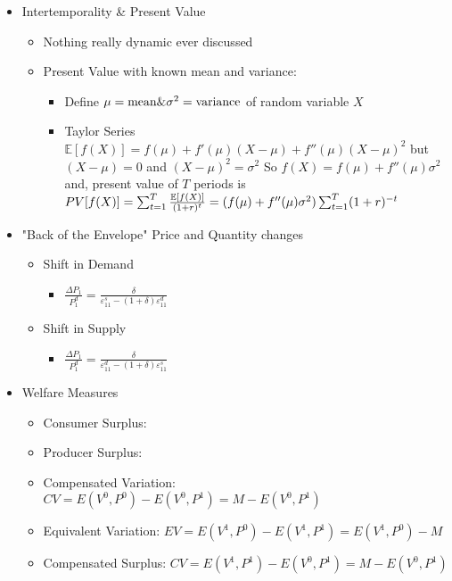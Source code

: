 \begin{itemize}
\begin{itemize}
	\end{itemize}
	\item Intertemporality \& Present Value
	\begin{itemize}
		\item Nothing really dynamic ever discussed
		\item Present Value with known mean and variance:
		\begin{itemize}
			\item Define $\mu = \text{mean} \space \& \space \sigma^2 = \text{variance}$ of random variable $X$
			\item Taylor Series\\
			$\mathbb{E}[f(X)] = f(\mu) + f'(\mu)(X - \mu) + f''(\mu)(X - \mu)^2$
			but $(X - \mu) = 0$ and $(X - \mu)^2 = \sigma^2$
			So $f(X) = f(\mu) + f''(\mu)\sigma^2$
			and, present value of $T$ periods is\\
			$PV[f(X)] = \sum_{t = 1}^T\frac{\mathbb{E}[f(X)]}{(1 + r)^t}\\
			= (f(\mu) + f''(\mu)\sigma^2)\sum_{t = 1}^T(1 + r)^{-t}$
		\end{itemize}	
	\end{itemize}
	\item "Back of the Envelope" Price and Quantity changes
	\begin{itemize}
		\item Shift in Demand
		\begin{itemize}
			\item $\frac{\Delta P_1}{P_1^d} = \frac{\delta}{\varepsilon_{11}^s - (1 + \delta)\varepsilon_{11}^d}$
		\end{itemize}
	\item Shift in Supply
		\begin{itemize}
			\item $\frac{\Delta P_1}{P_1^d} = \frac{\delta}{\varepsilon_{11}^d - (1 + \delta)\varepsilon_{11}^s}$
		\end{itemize}
	\end{itemize}
	\item Welfare Measures
	\begin{itemize}
		\item Consumer Surplus: 
		\item Producer Surplus:
		\item Compensated Variation: $CV = E(V^0,P^0) - E(V^0,P^1) = M - E(V^0,P^1)$
		\item Equivalent Variation: $EV = E(V^1,P^0) - E(V^1,P^1) = E(V^1,P^0) - M$
		\item Compensated Surplus: $CV = E(V^1,P^1) - E(V^0,P^1) = M - E(V^0,P^1)$

\end{itemize}
\end{itemize}
